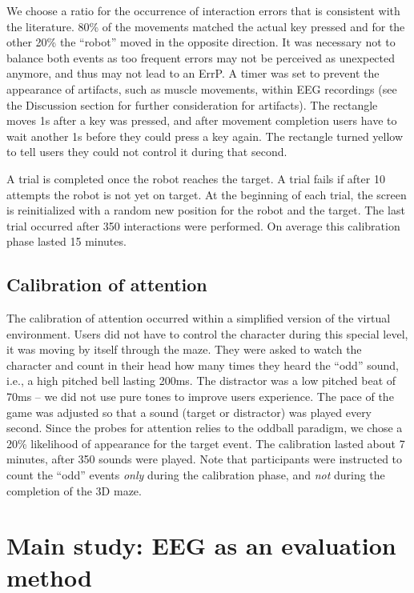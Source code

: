 \documentclass[]{sigchi}
\begin{document}
We choose a ratio for the occurrence of interaction errors that is
consistent with the literature. 80\% of the movements matched the actual
key pressed and for the other 20\% the ``robot'' moved in the opposite
direction. It was necessary not to balance both events as too frequent
errors may not be perceived as unexpected anymore, and thus may not lead
to an ErrP. A timer was set to prevent the appearance of artifacts, such
as muscle movements, within EEG recordings (see the Discussion section
for further consideration for artifacts). The rectangle moves 1s after a
key was pressed, and after movement completion users have to wait
another 1s before they could press a key again. The rectangle turned
yellow to tell users they could not control it during that second.

A trial is completed once the robot reaches the target. A trial fails if
after 10 attempts the robot is not yet on target. At the beginning of
each trial, the screen is reinitialized with a random new position for
the robot and the target. The last trial occurred after 350 interactions
were performed. On average this calibration phase lasted 15 minutes.

\subsection{Calibration of attention}\label{calibration-of-attention}

The calibration of attention occurred within a simplified version of the
virtual environment. Users did not have to control the character during
this special level, it was moving by itself through the maze. They were
asked to watch the character and count in their head how many times they
heard the ``odd'' sound, i.e., a high pitched bell lasting 200ms. The
distractor was a low pitched beat of 70ms -- we did not use pure tones
to improve users experience. The pace of the game was adjusted so that a
sound (target or distractor) was played every second. Since the probes
for attention relies to the oddball paradigm, we chose a 20\% likelihood
of appearance for the target event. The calibration lasted about 7
minutes, after 350 sounds were played. Note that participants were
instructed to count the ``odd'' events \emph{only} during the
calibration phase, and \emph{not} during the completion of the 3D maze.

\section{Main study: EEG as an evaluation
method}\label{main-study-eeg-as-an-evaluation-method}
\end{document}
